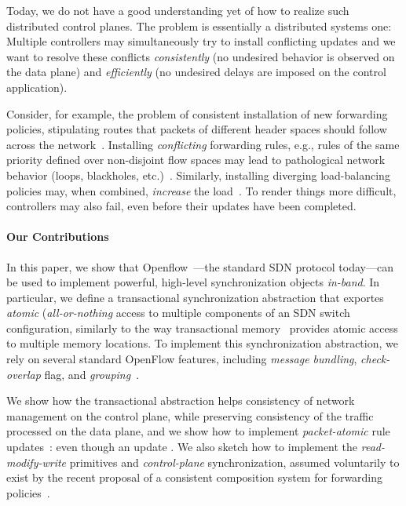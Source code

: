 \documentclass[conference]{sigcomm-alternate}
\begin{document}
Today, we do not have a good understanding yet of how to realize
such distributed control planes. The problem is essentially a
distributed systems
one: Multiple controllers may simultaneously try to
install conflicting updates and we want to resolve these conflicts
\emph{consistently} (no undesired behavior is observed on the data
plane) and \emph{efficiently} (no undesired delays are imposed on the
control application).

Consider, for example, the problem of
consistent installation of new forwarding policies, stipulating routes
that packets of different header spaces should follow across the
network~\cite{network-update,roger-hotnets,correct,stn}.
Installing \emph{conflicting} forwarding rules, e.g., rules of the same priority defined over non-disjoint
flow spaces may lead to pathological network behavior (loops,
blackholes, etc.)~\cite{cpc}.
Similarly, installing diverging load-balancing policies may,
when combined, \emph{increase} the load~\cite{log-cent}.
To render things more difficult, controllers may also fail,
even before their updates have been completed.

\paragraph{Our Contributions}
In this paper, we show that
Openflow~\cite{of-spec}---the standard SDN protocol today---can
be used to implement powerful, high-level
synchronization objects \emph{in-band}.
In particular, we define a transactional synchronization abstraction
that exportes \emph{atomic} (\emph{all-or-nothing} access to multiple
components of an SDN switch configuration, similarly to the way
transactional memory~\cite{stm-st95,tm-book} provides atomic access to
multiple memory locations.
To implement this synchronization abstraction, we rely on several
standard OpenFlow features, including \emph{message bundling},
\emph{check-overlap} flag, and \emph{grouping}~\cite{of-spec}.    

We show how the transactional abstraction helps consistency of network
management on the control plane, while preserving consistency of the
traffic processed on the data plane, and we show how to implement
\emph{packet-atomic} rule updates~\cite{network-update}: even though
an update .
We also sketch how to implement the \emph{read-modify-write} primitives
and \emph{control-plane} synchronization, assumed voluntarily to exist
by the recent proposal of a
consistent composition system for forwarding policies~\cite{cpc}.
\end{document}
